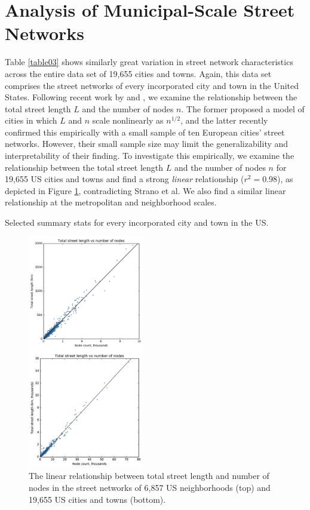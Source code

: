 \documentclass[Afour,sageh,times]{sage/sagej}
\begin{document}
\section{Analysis of Municipal-Scale Street Networks}

Table \ref{table03} shows similarly great variation in street network characteristics across the entire data set of 19,655 cities and towns. Again, this data set comprises the street networks of every incorporated city and town in the United States. Following recent work by \citet{barthelemy_modeling_2008} and \citet{strano_urban_2013}, we examine the relationship between the total street length $L$ and the number of nodes $n$. The former proposed a model of cities in which $L$ and $n$ scale nonlinearly as $n^{1/2}$, and the latter recently confirmed this empirically with a small sample of ten European cities' street networks. However, their small sample size may limit the generalizability and interpretability of their finding. To investigate this empirically, we examine the relationship between the total street length $L$ and the number of nodes $n$ for 19,655 US cities and towns and find a strong \emph{linear} relationship ($r^{2}=0.98$), as depicted in Figure \ref{fig03}, contradicting Strano et al. We also find a similar linear relationship at the metropolitan and neighborhood scales.

\begin{table}[h]
\caption{Selected summary stats for every incorporated city and town in the US.}
\label{table03}
\end{table}

\begin{figure}[h]
	\includegraphics[width=0.45\textwidth]{media/fig03-v.png}
	\caption{The linear relationship between total street length and number of nodes in the street networks of 6,857 US neighborhoods (top) and 19,655 US cities and towns (bottom).}
	\label{fig03}
\end{figure}
\end{document}
